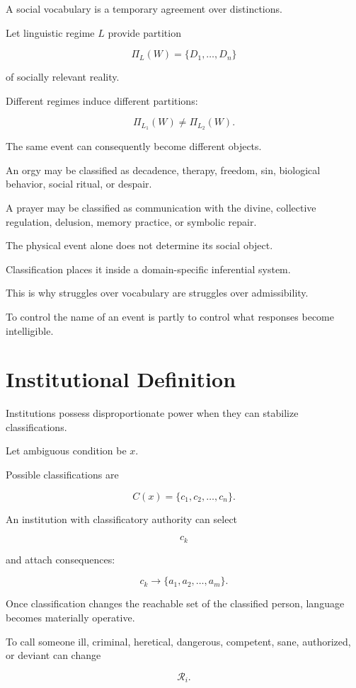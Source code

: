 \documentclass[11pt,oneside]{book}
\theoremstyle{definition}
\theoremstyle{remark}
\newcommand{\R}{\mathcal{R}}
\begin{document}
A social vocabulary is a temporary agreement over distinctions.

Let linguistic regime \(L\) provide partition

\[
\Pi_L(W)
=
\{D_1,\ldots,D_n\}
\]

of socially relevant reality.

Different regimes induce different partitions:

\[
\Pi_{L_1}(W)
\neq
\Pi_{L_2}(W).
\]

The same event can consequently become different objects.

An orgy may be classified as decadence, therapy, freedom, sin, biological behavior, social ritual, or despair.

A prayer may be classified as communication with the divine, collective regulation, delusion, memory practice, or symbolic repair.

The physical event alone does not determine its social object.

Classification places it inside a domain-specific inferential system.

This is why struggles over vocabulary are struggles over admissibility.

To control the name of an event is partly to control what responses become intelligible.

\section{Institutional Definition}

Institutions possess disproportionate power when they can stabilize classifications.

Let ambiguous condition be \(x\).

Possible classifications are

\[
C(x)
=
\{c_1,c_2,\ldots,c_n\}.
\]

An institution with classificatory authority can select

\[
c_k
\]

and attach consequences:

\[
c_k
\rightarrow
\{a_1,a_2,\ldots,a_m\}.
\]

Once classification changes the reachable set of the classified person, language becomes materially operative.

To call someone ill, criminal, heretical, dangerous, competent, sane, authorized, or deviant can change

\[
\R_i.
\]
\end{document}
